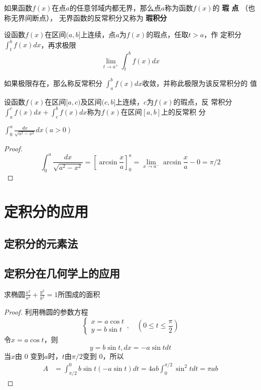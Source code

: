 \documentclass[11pt]{article}
\begin{document}
如果函数\(f(x)\)在点\(a\)的任意邻域内都无界，那么点\(a\)称为函数\(f(x)\)的 \textbf{瑕
点}  （也称无界间断点）， 无界函数的反常积分又称为 \textbf{瑕积分}

设函数\(f(x)\)在区间\((a,b]\)上连续，点\(a\)为\(f(x)\)的瑕点，任取\(t>a\)，作
定积分\(\int_t^bf(x)dx\)，再求极限
\begin{equation*}
\lim_{t\to a^+}\int^b_tf(x)dx
\end{equation*}

\begin{definition}[]
如果极限存在，那么称反常积分 \(\int_a^bf(x)dx\)收敛，并称此极限为该反常积分的
值
\end{definition}

设函数\(f(x)\)在区间\([a,c)\)及区间\((c,b]\)上连续，\(c\)为\(f(x)\)的瑕点，反
常积分\(\int_a^cf(x)dx+\int_c^bf(x)dx\)称为\(f(x)\)在区间\([a,b]\)上的反常积
分

\begin{proposition}[]
\(\int_0^a\frac{dx}{\sqrt{a^2-x^2}}dx(a>0)\)
\end{proposition}

\begin{proof}
\begin{equation*}
\int_0^a\frac{dx}{\sqrt{a^2-x^2}}=[\arcsin\frac{x}{a}]^a_0=\lim_{x\to a^-}
\arcsin \frac{x}{a}-0=\pi/2
\end{equation*}
\end{proof}
\section{定积分的应用}
\label{sec:org85e1523}
\subsection{定积分的元素法}
\label{sec:org3b94aa4}
\subsection{定积分在几何学上的应用}
\label{sec:org247f6ed}
\begin{examplle}[]
求椭圆\(\frac{x^2}{a^2}+\frac{y^2}{b^2}=1\)所围成的面积
\end{examplle}

\begin{proof}
利用椭圆的参数方程
\begin{equation*}
\begin{cases}
x=a\cos t \\
y=b\sin t
\end{cases},\quad (0\le t\le\frac{\pi}{2})
\end{equation*}
令\(x=a\cos t\)，则
\begin{equation*}
y=b\sin t,dx=-a\sin t dt
\end{equation*}
当\(x\)由 0 变到\(a\)时，\(t\)由\(\pi/2\)变到 0，所以
\begin{align*}
A&=\int_{\pi/2}^0b\sin t(-a\sin t)dt=4ab\int_0^{\pi/2}\sin^2tdt=\pi ab
\end{align*}
\end{proof}
\end{document}
